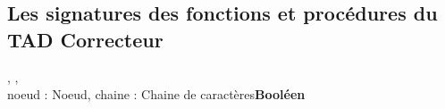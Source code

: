 \subsection{Les signatures des fonctions et procédures du TAD Correcteur}
    
    \begin{algorithme}    
    {, , }\\
    
    {noeud : Noeud, chaine : Chaine de caractères}{\textbf{Booléen}}
    \end{algorithme}
